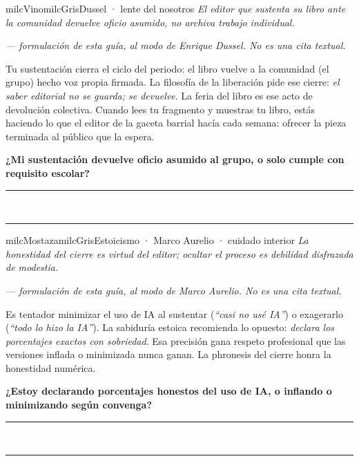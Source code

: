 \documentclass[11pt,letterpaper]{article}
\newcommand{\linead}[1]{\noindent\color{milcLinea}\rule{#1}{0.5pt}\color{milcNegro}}
\begin{document}
\begin{softbox}{milcVino}{milcGris}{Dussel · lente del nosotros}
\textit{El editor que sustenta su libro ante la comunidad devuelve oficio asumido, no archiva trabajo individual.}

{\footnotesize\itshape\color{milcNegro!70}--- formulación de esta guía, al modo de Enrique Dussel. No es una cita textual.}

Tu sustentación cierra el ciclo del periodo: el libro vuelve a la comunidad (el grupo) hecho voz propia firmada. La filosofía de la liberación pide ese cierre: \emph{el saber editorial no se guarda; se devuelve}. La feria del libro es ese acto de devolución colectiva. Cuando lees tu fragmento y muestras tu libro, estás haciendo lo que el editor de la gaceta barrial hacía cada semana: ofrecer la pieza terminada al público que la espera.

\textbf{¿Mi sustentación devuelve oficio asumido al grupo, o solo cumple con requisito escolar?}
\end{softbox}
\linead{\linewidth}\\[1mm]
\linead{\linewidth}

\begin{softbox}{milcMostaza}{milcGris}{Estoicismo · Marco Aurelio · cuidado interior}
\textit{La honestidad del cierre es virtud del editor; ocultar el proceso es debilidad disfrazada de modestia.}

{\footnotesize\itshape\color{milcNegro!70}--- formulación de esta guía, al modo de Marco Aurelio. No es una cita textual.}

Es tentador minimizar el uso de IA al sustentar (\emph{``casi no usé IA''}) o exagerarlo (\emph{``todo lo hizo la IA''}). La sabiduría estoica recomienda lo opuesto: \emph{declara los porcentajes exactos con sobriedad}. Esa precisión gana respeto profesional que las versiones inflada o minimizada nunca ganan. La phronesis del cierre honra la honestidad numérica.

\textbf{¿Estoy declarando porcentajes honestos del uso de IA, o inflando o minimizando según convenga?}
\end{softbox}
\linead{\linewidth}\\[1mm]
\linead{\linewidth}
\end{document}
